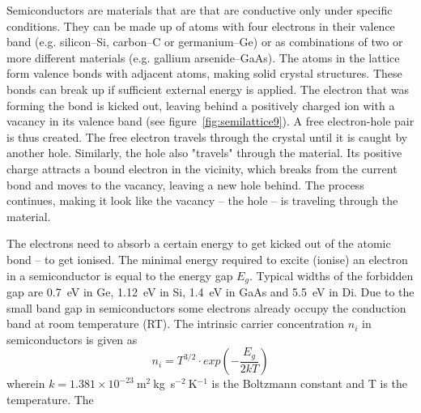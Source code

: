 \documentclass[12pt]{mytustyle}  %
\begin{document}
Semiconductors are materials that are that are conductive only under specific conditions. They can be made up of atoms with four electrons in their valence band (e.g. silicon--Si, carbon--C or germanium--Ge) or as combinations of two or more different materials (e.g. gallium arsenide--GaAs). The atoms in the lattice form valence bonds with adjacent atoms, making solid crystal structures. These bonds can break up if sufficient external energy is applied. The electron that was forming the bond is kicked out, leaving behind a positively charged ion with a vacancy in its valence band (see figure~\ref{fig:semilattice9}). A free electron-hole pair is thus created. The free electron travels through the crystal until it is caught by another hole. Similarly, the hole also "travels" through the material. Its positive charge attracts a bound electron in the vicinity, which breaks from the current bond and moves to the vacancy, leaving a new hole behind. The process continues, making it look like the vacancy -- the hole -- is traveling through the material.




The electrons need to absorb a certain energy to get kicked out of the atomic bond -- to get ionised. The minimal energy required to excite (ionise) an electron in a semiconductor is equal to the energy gap $E_g$. Typical widths of the forbidden gap are 0.7~eV in Ge, 1.12~eV in Si, 1.4~eV in GaAs and 5.5~eV in Di. Due to the small band gap in semiconductors some electrons already occupy the conduction band at room temperature (RT). The intrinsic carrier concentration $n_i$ in semiconductors is given as
\begin{equation}
\label{eq:intrinsiccarrier}
n_i = T^{3/2} \cdot exp(-\frac{E_g}{2kT}) 
\end{equation} 
wherein $k = 1.381\times10^{-23}~$m$^2~$kg~s$^{-2}~$K$^{-1}$ is the Boltzmann constant and T is the temperature. The 
\end{document}
